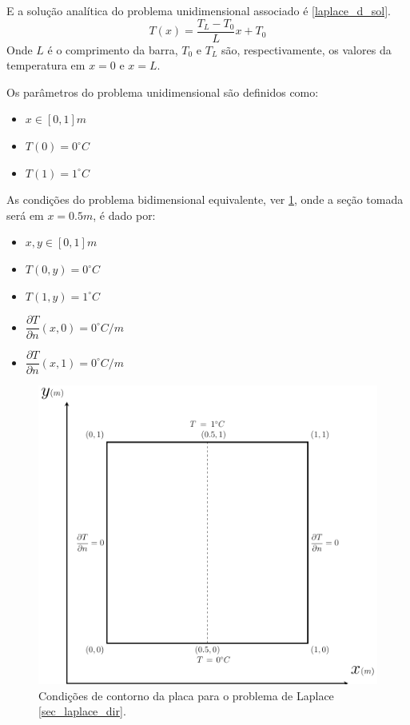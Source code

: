 E a solução analítica do problema unidimensional associado é \ref{laplace_d_sol}.
\begin{equation}
    T(x) = \dfrac{T_L-T_0}{L} x + T_0
    \label{laplace_d_sol}
\end{equation}
Onde $L$ é o comprimento da barra, $T_0$ e $T_L$ são, respectivamente, os valores da temperatura em $x=0$ e $x=L$.

Os parâmetros do problema unidimensional são definidos como:
\begin{itemize}
    \item $x\in [0,1]m$
    \item $T(0) = 0^{\circ}C$
    \item $T(1) = 1^{\circ}C$
\end{itemize}

As condições do problema bidimensional equivalente, ver \ref{laplace_d_bc}, onde a seção tomada será em $x=0.5m$, é dado por:
\begin{itemize}
    \item $x,y\in [0,1]m$
    \item $T(0,y) = 0^{\circ}C$
    \item $T(1,y) = 1^{\circ}C$
    \item $\dfrac{\partial T}{\partial n}(x,0) = 0^{\circ}C/m$
    \item $\dfrac{\partial T}{\partial n}(x,1) = 0^{\circ}C/m$
\end{itemize}

\begin{figure}[H]
    \centering
    \includegraphics[width=.7\linewidth]{figures/laplace_dirichlet_boundary_conditions.pdf}
    \caption{Condições de contorno da placa para o problema de Laplace \ref{sec_laplace_dir}.}
    \label{laplace_d_bc}
\end{figure}


